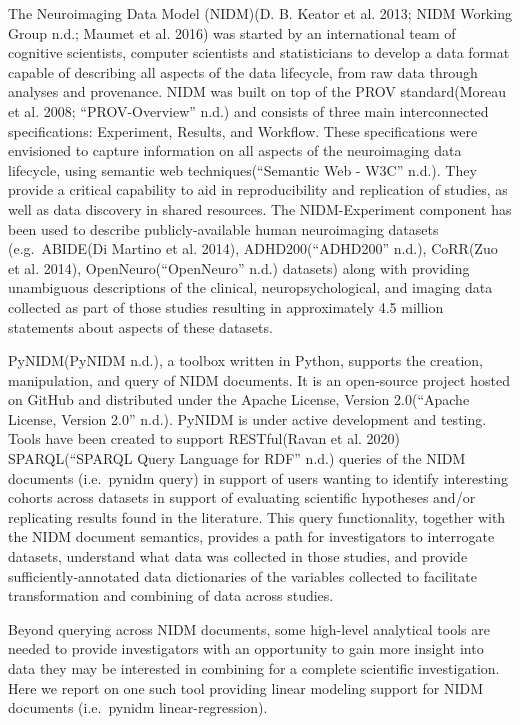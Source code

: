 The Neuroimaging Data Model (NIDM)(D. B. Keator et al. 2013; NIDM
Working Group n.d.; Maumet et al. 2016) was started by an international
team of cognitive scientists, computer scientists and statisticians to
develop a data format capable of describing all aspects of the data
lifecycle, from raw data through analyses and provenance. NIDM was built
on top of the PROV standard(Moreau et al. 2008; ``PROV-Overview'' n.d.)
and consists of three main interconnected specifications: Experiment,
Results, and Workflow. These specifications were envisioned to capture
information on all aspects of the neuroimaging data lifecycle, using
semantic web techniques(``Semantic Web - W3C'' n.d.). They provide a
critical capability to aid in reproducibility and replication of
studies, as well as data discovery in shared resources. The
NIDM-Experiment component has been used to describe publicly-available
human neuroimaging datasets (e.g.~ABIDE(Di Martino et al. 2014),
ADHD200(``ADHD200'' n.d.), CoRR(Zuo et al. 2014),
OpenNeuro(``OpenNeuro'' n.d.) datasets) along with providing unambiguous
descriptions of the clinical, neuropsychological, and imaging data
collected as part of those studies resulting in approximately 4.5
million statements about aspects of these datasets.

PyNIDM(PyNIDM n.d.), a toolbox written in Python, supports the creation,
manipulation, and query of NIDM documents. It is an open-source project
hosted on GitHub and distributed under the Apache License, Version
2.0(``Apache License, Version 2.0'' n.d.). PyNIDM is under active
development and testing. Tools have been created to support
RESTful(Ravan et al. 2020) SPARQL(``SPARQL Query Language for RDF''
n.d.) queries of the NIDM documents (i.e.~pynidm query) in support of
users wanting to identify interesting cohorts across datasets in support
of evaluating scientific hypotheses and/or replicating results found in
the literature. This query functionality, together with the NIDM
document semantics, provides a path for investigators to interrogate
datasets, understand what data was collected in those studies, and
provide sufficiently-annotated data dictionaries of the variables
collected to facilitate transformation and combining of data across
studies.

Beyond querying across NIDM documents, some high-level analytical tools
are needed to provide investigators with an opportunity to gain more
insight into data they may be interested in combining for a complete
scientific investigation. Here we report on one such tool providing
linear modeling support for NIDM documents (i.e.~pynidm
linear-regression).


